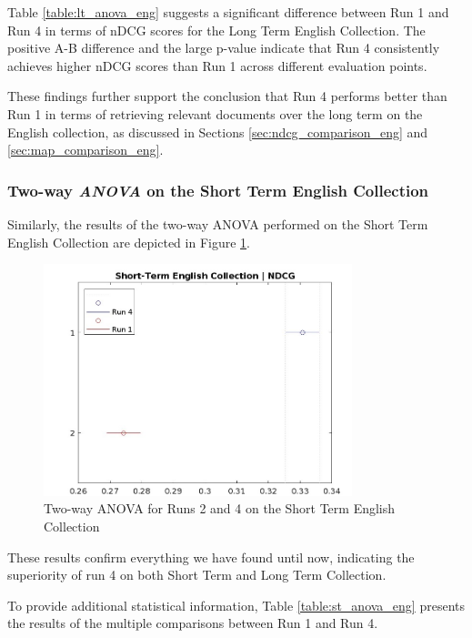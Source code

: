 Table \ref{table:lt_anova_eng} suggests a significant difference between Run 1 and Run 4 in terms of \ac{nDCG} scores for the Long Term English Collection. 
The positive A-B difference and the large p-value indicate that Run 4 consistently achieves higher \ac{nDCG} scores than Run 1 across different evaluation points.

These findings further support the conclusion that Run 4 performs better than Run 1 in terms of retrieving relevant documents over the long term on the English collection, as discussed in Sections \ref{sec:ndcg_comparison_eng} and \ref{sec:map_comparison_eng}.


\enlargethispage{5\baselineskip}
\subsubsection{Two-way \textit{ANOVA} on the Short Term English Collection}

Similarly, the results of the two-way \ac{ANOVA} performed on the Short Term English Collection are depicted in Figure \ref{fig:st_anova_eng}.

\begin{figure}[!h]
\centering
\includegraphics[width=0.8\textwidth]{figure/StatisticalAnalysis/ANOVA 2/ndcg-st-en.jpeg}
\caption{Two-way ANOVA for Runs 2 and 4 on the Short Term English Collection}
\label{fig:st_anova_eng}
\end{figure}

\newpage
These results confirm everything we have found until now, indicating the superiority of run 4 on both Short Term and Long Term Collection.

To provide additional statistical information, Table \ref{table:st_anova_eng} presents the results of the multiple comparisons between Run 1 and Run 4.

